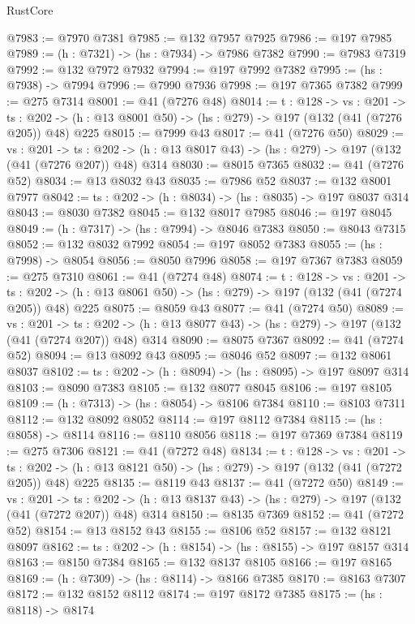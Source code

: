 \begin{lexlean}{RustCore}
\begin{coremodule}
@7983 := @7970 @7381
@7985 := @132 @7957 @7925
@7986 := @197 @7985
@7989 := (h : @7321) -> (hs : @7934) -> @7986 @7382
@7990 := @7983 @7319
@7992 := @132 @7972 @7932
@7994 := @197 @7992 @7382
@7995 := (hs : @7938) -> @7994
@7996 := @7990 @7936
@7998 := @197 @7365 @7382
@7999 := @275 @7314
@8001 := @41 (@7276 @48)
@8014 := {t : @128} ->
  {vs : @201} ->
  {ts : @202} -> (h : @13 @8001 @50) -> (hs : @279) -> @197 (@132 (@41 (@7276 @205)) @48) @225
@8015 := @7999 @43
@8017 := @41 (@7276 @50)
@8029 := {vs : @201} ->
  {ts : @202} -> (h : @13 @8017 @43) -> (hs : @279) -> @197 (@132 (@41 (@7276 @207)) @48) @314
@8030 := @8015 @7365
@8032 := @41 (@7276 @52)
@8034 := @13 @8032 @43
@8035 := @7986 @52
@8037 := @132 @8001 @7977
@8042 := {ts : @202} -> (h : @8034) -> (hs : @8035) -> @197 @8037 @314
@8043 := @8030 @7382
@8045 := @132 @8017 @7985
@8046 := @197 @8045
@8049 := (h : @7317) -> (hs : @7994) -> @8046 @7383
@8050 := @8043 @7315
@8052 := @132 @8032 @7992
@8054 := @197 @8052 @7383
@8055 := (hs : @7998) -> @8054
@8056 := @8050 @7996
@8058 := @197 @7367 @7383
@8059 := @275 @7310
@8061 := @41 (@7274 @48)
@8074 := {t : @128} ->
  {vs : @201} ->
  {ts : @202} -> (h : @13 @8061 @50) -> (hs : @279) -> @197 (@132 (@41 (@7274 @205)) @48) @225
@8075 := @8059 @43
@8077 := @41 (@7274 @50)
@8089 := {vs : @201} ->
  {ts : @202} -> (h : @13 @8077 @43) -> (hs : @279) -> @197 (@132 (@41 (@7274 @207)) @48) @314
@8090 := @8075 @7367
@8092 := @41 (@7274 @52)
@8094 := @13 @8092 @43
@8095 := @8046 @52
@8097 := @132 @8061 @8037
@8102 := {ts : @202} -> (h : @8094) -> (hs : @8095) -> @197 @8097 @314
@8103 := @8090 @7383
@8105 := @132 @8077 @8045
@8106 := @197 @8105
@8109 := (h : @7313) -> (hs : @8054) -> @8106 @7384
@8110 := @8103 @7311
@8112 := @132 @8092 @8052
@8114 := @197 @8112 @7384
@8115 := (hs : @8058) -> @8114
@8116 := @8110 @8056
@8118 := @197 @7369 @7384
@8119 := @275 @7306
@8121 := @41 (@7272 @48)
@8134 := {t : @128} ->
  {vs : @201} ->
  {ts : @202} -> (h : @13 @8121 @50) -> (hs : @279) -> @197 (@132 (@41 (@7272 @205)) @48) @225
@8135 := @8119 @43
@8137 := @41 (@7272 @50)
@8149 := {vs : @201} ->
  {ts : @202} -> (h : @13 @8137 @43) -> (hs : @279) -> @197 (@132 (@41 (@7272 @207)) @48) @314
@8150 := @8135 @7369
@8152 := @41 (@7272 @52)
@8154 := @13 @8152 @43
@8155 := @8106 @52
@8157 := @132 @8121 @8097
@8162 := {ts : @202} -> (h : @8154) -> (hs : @8155) -> @197 @8157 @314
@8163 := @8150 @7384
@8165 := @132 @8137 @8105
@8166 := @197 @8165
@8169 := (h : @7309) -> (hs : @8114) -> @8166 @7385
@8170 := @8163 @7307
@8172 := @132 @8152 @8112
@8174 := @197 @8172 @7385
@8175 := (hs : @8118) -> @8174

\end{coremodule}
\end{lexlean}
